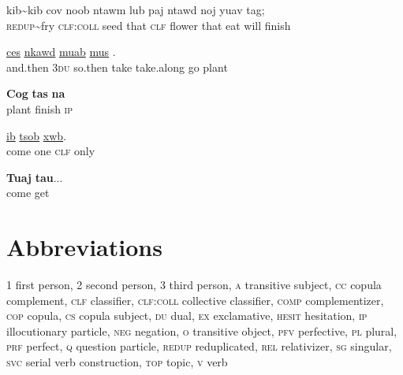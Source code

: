 \documentclass[output=paper]{LSP/langsci}
\begin{document}
\begin{exe}
 \label{JaexApp28}
\gll kib{\textasciitilde}kib cov noob ntawm lub paj ntawd noj yuav tag;\\
     \textsc{redup}{\textasciitilde}fry \textsc{clf:coll} seed that \textsc{clf} flower that eat will finish\\
\glt {}
\end{exe}

\begin{exe}
 \label{JaexApp29}
\gll  \underline{ces}  \underline{nkawd}  \underline{}  \underline{muab}  \underline{}  \underline{mus}  \underline{}.\\
     and.then 3\textsc{du} so.then take take.along go plant\\
\glt {}
\end{exe}

\begin{exe}
 \label{JaexApp30}
\gll \textbf{Cog} \textbf{tas} \textbf{na}\\
     plant finish \textsc{ip}\\
\glt {}
\end{exe}


\begin{exe}
 \label{JaexApp31}
\gll \underline{} \underline{ib} \underline{tsob} \underline{xwb}.\\
     come one \textsc{clf} only\\
\glt {}
\end{exe}

\begin{exe}
 \label{JaexApp32}
\gll \textbf{Tuaj} \textbf{tau}...\\
     come get\\
\glt {}
\end{exe}

\section*{Abbreviations}
\textsc{1}		first person,
\textsc{2}		second person,
\textsc{3} 		third person,
\textsc{a}		transitive subject,
\textsc{cc}		copula complement,
\textsc{clf}		classifier,
\textsc{clf:coll}		collective classifier,
\textsc{comp}		complementizer,
\textsc{cop}		copula,
\textsc{cs}		copula subject,
\textsc{du}		dual,
\textsc{ex}		exclamative,
\textsc{hesit}		hesitation,
\textsc{ip}		illocutionary particle,
\textsc{neg}		negation,
\textsc{o}		transitive object,
\textsc{pfv}		perfective,
\textsc{pl}		plural,
\textsc{prf}		perfect,
\textsc{q}		question particle,
\textsc{redup}		reduplicated,
\textsc{rel}		relativizer,
\textsc{sg}		singular,
\textsc{svc}	serial verb construction,
\textsc{top}		topic,
\textsc{v}	verb
\end{document}
